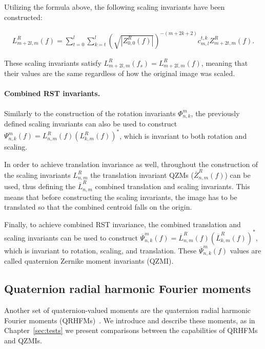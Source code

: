Utilizing the formula above, the following scaling invariants have been constructed:


\begin{gather*}
    L_{m + 2l,m}^R(f) = \sum_{t=0}^l\sum_{k=t}^l\left(\sqrt{|Z_{0,0}^R(f)|}\right)^{-(m+2k+2)}c_{m,l}^{t,k}Z_{m+2t,m}^R(f).
\end{gather*}

These scaling invariants satisfy $L_{m + 2l,m}^R(f_s) = L_{m + 2l,m}^R(f)$, meaning that their values are the same regardless of how the original image was scaled.


\paragraph{Combined RST invariants.}
Similarly to the construction of the rotation invariants $\Phi_{n,k}^m$, the previously defined scaling invariants can also be used to construct $\Psi_{n,k}^m(f) = L_{n,m}^R(f)(L_{k,m}^R(f))^*$, which is invariant to both rotation and scaling.


In order to achieve translation invariance as well, throughout the construction of the scaling invariants $L_{n,m}^R$ the translation invariant QZMs ($\overline{Z}_{n,m}^R(f)$) can be used, thus defining the $\overline{L}_{n,m}^R$ combined translation and scaling invariants. This means that before constructing the scaling invariants, the image has to be translated so that the combined centroid falls on the origin.


Finally, to achieve combined RST invariance, the combined translation and scaling invariants can be used to construct $\overline{\Psi}_{n,k}^m(f) = \overline{L}_{n,m}^R(f)(\overline{L}_{k,m}^R(f))^*$, which is invariant to rotation, scaling, and translation. These $\overline{\Psi}_{n,k}^m(f)$ values are called quaternion Zernike moment invariants (QZMI).


\subsection{Quaternion radial harmonic Fourier moments}
Another set of quaternion-valued moments are the quaternion radial harmonic Fourier moments (QRHFMs)~\cite{LiuAcc}. We introduce and describe these moments, as in Chapter~\ref{sec:tests} we present comparisons between the capabilities of QRHFMs and QZMIs.



